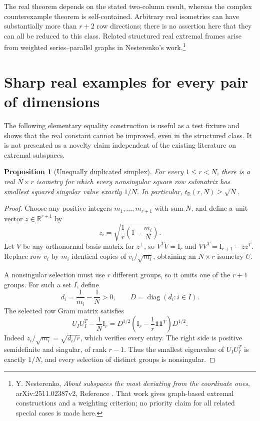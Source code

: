 \documentclass[11pt,letterpaper]{article}
\newtheorem{proposition}[theorem]{Proposition}
\theoremstyle{definition}
\theoremstyle{remark}
\newcommand{\R}{\mathbb R}
\newcommand{\Id}{\mathrm I}
\newcommand{\diag}{\operatorname{diag}}
\begin{document}
The real theorem depends on the stated two-column result, whereas the complex counterexample theorem is self-contained. Arbitrary real isometries can have substantially more than $r+2$ row directions; there is no assertion here that they can all be reduced to this class. Related structured real extremal frames arise from weighted series--parallel graphs in Nesterenko's work.\footnote{Y. Nesterenko, \emph{About subspaces the most deviating from the coordinate ones}, arXiv:2511.02387v2, Reference \cite{graphs}. That work gives graph-based extremal constructions and a weighting criterion; no priority claim for all related special cases is made here.}

\section{Sharp real examples for every pair of dimensions}

The following elementary equality construction is useful as a test fixture and shows that the real constant cannot be improved, even in the structured class. It is not presented as a novelty claim independent of the existing literature on extremal subspaces.

\begin{proposition}[Unequally duplicated simplex]\label{prop:sharp}
For every $1\le r<N$, there is a real $N\times r$ isometry for which every nonsingular square row submatrix has smallest squared singular value exactly $1/N$. In particular, $t_\R(r,N)\ge\sqrt N$.
\end{proposition}
\begin{proof}
Choose any positive integers $m_1,\ldots,m_{r+1}$ with sum $N$, and define a unit vector $z\in\R^{r+1}$ by
\[
 z_i=\sqrt{\frac1r\left(1-\frac{m_i}{N}\right)}.
\]
Let $V$ be any orthonormal basis matrix for $z^\perp$, so
$V^TV=\Id_r$ and $VV^T=\Id_{r+1}-zz^T$. Replace row $v_i$ by $m_i$ identical copies of $v_i/\sqrt{m_i}$, obtaining an $N\times r$ isometry $U$.

A nonsingular selection must use $r$ different groups, so it omits one of the $r+1$ groups. For such a set $I$, define
\[
 d_i=\frac1{m_i}-\frac1N>0,
 \qquad D=\diag(d_i:i\in I).
\]
The selected row Gram matrix satisfies
\begin{equation}
 U_IU_I^T-\frac1N\Id_r
 =D^{1/2}\left(\Id_r-\frac1r\mathbf1\mathbf1^T\right)D^{1/2}.
 \label{eq:sharpidentity}
\end{equation}
Indeed $z_i/\sqrt{m_i}=\sqrt{d_i/r}$, which verifies every entry. The right side is positive semidefinite and singular, of rank $r-1$. Thus the smallest eigenvalue of $U_IU_I^T$ is exactly $1/N$, and every selection of distinct groups is nonsingular.
\end{proof}
\end{document}
